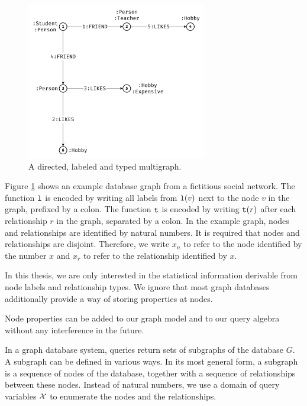 \begin{figure}
  \centering
  \includegraphics[width=0.7\textwidth]{figures/friend_likes_graph.pdf}
  \caption{A directed, labeled and typed multigraph.}
  \label{fig:dlt-graph}
\end{figure}

Figure \ref{fig:dlt-graph} shows an example database graph from a fictitious
social network. The function $\texttt{l}$ is encoded by writing all labels from
$\texttt{l}(v)$ next to the node $v$ in the graph, prefixed by a colon.
The function $\texttt{t}$ is encoded by writing $\texttt{t}(r)$ after each relationship
$r$ in the graph, separated by a colon.
In the example graph, nodes and relationships are identified by natural
numbers. It is required that nodes and relationships are disjoint. Therefore,
we write $x_n$ to refer to the node identified by the number $x$ and $x_r$ to
refer to the relationship identified by $x$.

\begin{remark}
In this thesis, we are only interested in the statistical information
derivable from node labels and relationship types.
We ignore that most graph databases additionally provide
a way of storing properties at nodes.

Node properties can be added to our graph model and to our query
algebra without any interference in the future.
\end{remark}

In a graph database system, queries return sets of subgraphs of the database $G$.
A subgraph can be defined in various ways. In its most general form, a subgraph
is a sequence of nodes of the database, together with a sequence of
relationships between these nodes.
Instead of natural numbers, we use a domain of query variables $\mathcal{X}$ to
enumerate the nodes and the relationships.

